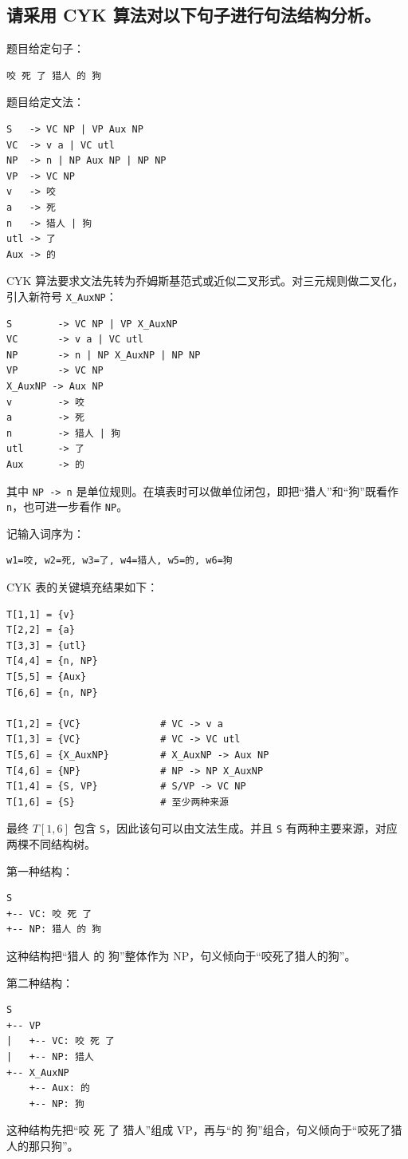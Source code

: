 \subsection{请采用 CYK 算法对以下句子进行句法结构分析。}

题目给定句子：
\begin{verbatim}
咬 死 了 猎人 的 狗
\end{verbatim}

题目给定文法：
\begin{verbatim}
S   -> VC NP | VP Aux NP
VC  -> v a | VC utl
NP  -> n | NP Aux NP | NP NP
VP  -> VC NP
v   -> 咬
a   -> 死
n   -> 猎人 | 狗
utl -> 了
Aux -> 的
\end{verbatim}

CYK 算法要求文法先转为乔姆斯基范式或近似二叉形式。对三元规则做二叉化，引入新符号 \texttt{X\_AuxNP}：
\begin{verbatim}
S        -> VC NP | VP X_AuxNP
VC       -> v a | VC utl
NP       -> n | NP X_AuxNP | NP NP
VP       -> VC NP
X_AuxNP -> Aux NP
v        -> 咬
a        -> 死
n        -> 猎人 | 狗
utl      -> 了
Aux      -> 的
\end{verbatim}

其中 \texttt{NP -> n} 是单位规则。在填表时可以做单位闭包，即把“猎人”和“狗”既看作 \texttt{n}，也可进一步看作 \texttt{NP}。

记输入词序为：
\begin{verbatim}
w1=咬, w2=死, w3=了, w4=猎人, w5=的, w6=狗
\end{verbatim}

CYK 表的关键填充结果如下：
\begin{verbatim}
T[1,1] = {v}
T[2,2] = {a}
T[3,3] = {utl}
T[4,4] = {n, NP}
T[5,5] = {Aux}
T[6,6] = {n, NP}

T[1,2] = {VC}              # VC -> v a
T[1,3] = {VC}              # VC -> VC utl
T[5,6] = {X_AuxNP}         # X_AuxNP -> Aux NP
T[4,6] = {NP}              # NP -> NP X_AuxNP
T[1,4] = {S, VP}           # S/VP -> VC NP
T[1,6] = {S}               # 至少两种来源
\end{verbatim}

最终 $T[1,6]$ 包含 \texttt{S}，因此该句可以由文法生成。并且 \texttt{S} 有两种主要来源，对应两棵不同结构树。

第一种结构：
\begin{verbatim}
S
+-- VC: 咬 死 了
+-- NP: 猎人 的 狗
\end{verbatim}
这种结构把“猎人 的 狗”整体作为 NP，句义倾向于“咬死了猎人的狗”。

第二种结构：
\begin{verbatim}
S
+-- VP
|   +-- VC: 咬 死 了
|   +-- NP: 猎人
+-- X_AuxNP
    +-- Aux: 的
    +-- NP: 狗
\end{verbatim}
这种结构先把“咬 死 了 猎人”组成 VP，再与“的 狗”组合，句义倾向于“咬死了猎人的那只狗”。

